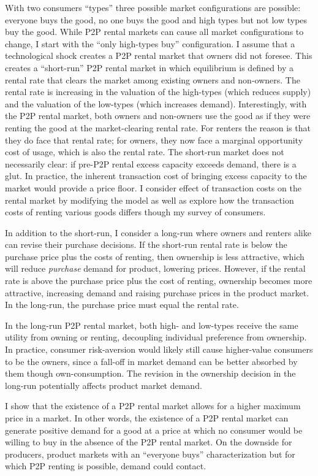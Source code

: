 \documentclass[11pt]{article}
\begin{document}
With two consumers ``types'' three possible market configurations are possible: 
everyone buys the good, no one buys the good and high types but not low types buy the good.  
While P2P rental markets can cause all market configurations to change, I start with the ``only high-types buy'' configuration. 
I assume that a technological shock creates a P2P rental market that owners did not foresee. 
This creates a ``short-run'' P2P rental market in which equilibrium is defined by a rental rate that clears the market among existing owners and non-owners. 
The rental rate is increasing in the valuation of the high-types (which reduces supply) and the valuation of the low-types (which increases demand). 
Interestingly, with the P2P rental market, both owners and non-owners use the good as if they were renting the good at the market-clearing rental rate. 
For renters the reason is that they do face that rental rate; 
for owners, they now face a marginal opportunity cost of usage, which is also the rental rate. 
The short-run market does not necessarily clear: if pre-P2P rental excess capacity exceeds demand, there is a glut. 
In practice, the inherent transaction cost of bringing excess capacity to the market would provide a price floor.     
I consider effect of transaction costs on the rental market by modifying the model as well as explore how the transaction costs of renting various goods differs though my survey of consumers. 

In addition to the short-run, I consider a long-run where owners and renters alike can revise their purchase decisions. 
If the short-run rental rate is below the purchase price plus the costs of renting, then ownership is less attractive, which will reduce \emph{purchase} demand for product, lowering prices. 
However, if the rental rate is above the purchase price plus the cost of renting, ownership becomes more attractive, increasing demand and raising purchase prices in the product market. 
In the long-run, the purchase price must equal the rental rate.  

In the long-run P2P rental market, both high- and low-types receive the same utility from owning or renting, decoupling individual preference from ownership. 
In practice, consumer risk-aversion would likely still cause higher-value consumers to be the owners, since a fall-off in market demand can be better absorbed by them though own-consumption. 
The revision in the ownership decision in the long-run potentially affects product market demand. 

I show that the existence of a P2P rental market allows for a higher maximum price in a market. 
In other words, the existence of a P2P rental market can generate positive demand for a good at a price at which no consumer would be willing to buy in the absence of the P2P rental market. 
On the downside for producers, product markets with an ``everyone buys'' characterization but for which P2P renting is possible, demand could contact.   
\end{document}
